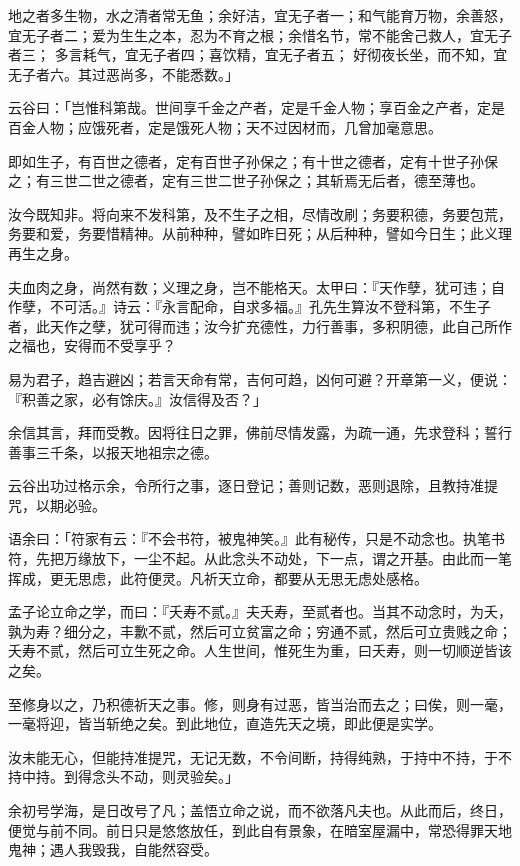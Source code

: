 \documentclass[12pt,twoside,openany]{book}
\begin{document}
地之者多生物，水之清者常无鱼；余好洁，宜无子者一；和气能育万物，余善怒，宜无子者二；爱为生生之本，忍为不育之根；余惜名节，常不能舍己救人，宜无子者三； 多言耗气，宜无子者四；喜饮精，宜无子者五； 好彻夜长坐，而不知，宜无子者六。其过恶尚多，不能悉数。」

云谷曰：「岂惟科第哉。世间享千金之产者，定是千金人物；享百金之产者，定是百金人物；应饿死者，定是饿死人物；天不过因材而，几曾加毫意思。

即如生子，有百世之德者，定有百世子孙保之；有十世之德者，定有十世子孙保之；有三世二世之德者，定有三世二世子孙保之；其斩焉无后者，德至薄也。

汝今既知非。将向来不发科第，及不生子之相，尽情改刷；务要积德，务要包荒，务要和爱，务要惜精神。从前种种，譬如昨日死；从后种种，譬如今日生；此义理再生之身。

夫血肉之身，尚然有数；义理之身，岂不能格天。太甲曰：『天作孽，犹可违；自作孽，不可活。』诗云：『永言配命，自求多福。』孔先生算汝不登科第，不生子者，此天作之孽，犹可得而违；汝今扩充德性，力行善事，多积阴德，此自己所作之福也，安得而不受享乎？

易为君子，趋吉避凶；若言天命有常，吉何可趋，凶何可避？开章第一义，便说：『积善之家，必有馀庆。』汝信得及否？」

余信其言，拜而受教。因将往日之罪，佛前尽情发露，为疏一通，先求登科；誓行善事三千条，以报天地祖宗之德。

云谷出功过格示余，令所行之事，逐日登记；善则记数，恶则退除，且教持准提咒，以期必验。

语余曰：「符家有云：『不会书符，被鬼神笑。』此有秘传，只是不动念也。执笔书符，先把万缘放下，一尘不起。从此念头不动处，下一点，谓之开基。由此而一笔挥成，更无思虑，此符便灵。凡祈天立命，都要从无思无虑处感格。

孟子论立命之学，而曰：『夭寿不贰。』夫夭寿，至贰者也。当其不动念时，为夭，孰为寿？细分之，丰歉不贰，然后可立贫富之命；穷通不贰，然后可立贵贱之命；夭寿不贰，然后可立生死之命。人生世间，惟死生为重，曰夭寿，则一切顺逆皆该之矣。

至修身以之，乃积德祈天之事。修，则身有过恶，皆当治而去之；曰俟，则一毫，一毫将迎，皆当斩绝之矣。到此地位，直造先天之境，即此便是实学。

汝未能无心，但能持准提咒，无记无数，不令间断，持得纯熟，于持中不持，于不持中持。到得念头不动，则灵验矣。」

余初号学海，是日改号了凡；盖悟立命之说，而不欲落凡夫也。从此而后，终日，便觉与前不同。前日只是悠悠放任，到此自有景象，在暗室屋漏中，常恐得罪天地鬼神；遇人我毁我，自能然容受。
\end{document}
